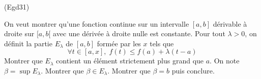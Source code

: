 \begin{tiny}(Egd31)\end{tiny} On veut montrer qu'une fonction continue sur un intervalle $[a,b]$ dérivable à droite sur $[a,b[$ avec une dérivée à droite nulle est constante.\newline
Pour tout $\lambda >0$, on définit la partie $E_\lambda$ de $[a,b]$ formée par les $x$ tels que
\begin{displaymath}
 \forall t\in [a,x],\; f(t)\leq f(a) + \lambda(t-a)
\end{displaymath}
 Montrer que $E_\lambda$ contient un élément strictement plus grand que $a$. On note $\beta=\sup E_\lambda$. Montrer que $\beta\in E_\lambda$. Montrer que $\beta=b$ puis conclure.